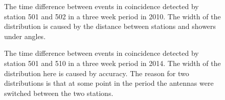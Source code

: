 \begin{figure}
    \centering
    
    \caption{ The
             time difference between events in coincidence detected by
             station 501 and 502 in a three week period in 2010. The
             width of the distribution is caused by the distance between
             stations and showers under angles.}
    \label{fig:station_offsets_501_502}
\end{figure}

\begin{figure}
    \centering
    
    \caption{ The
             time difference between events in coincidence detected by
             station 501 and 510 in a three week period in 2014. The
             width of the distribution here is caused by \gps accuracy.
             The reason for two distributions is that at some point in
             the period the \gps antennas were switched between the two
             stations.}
    \label{fig:station_offsets_501_510}
\end{figure}
